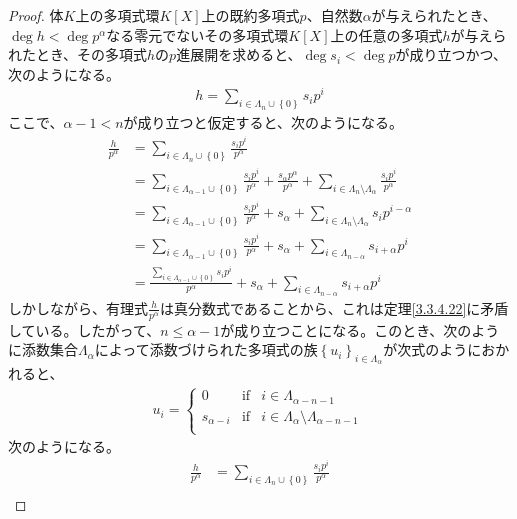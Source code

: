 \documentclass[dvipdfmx]{jsarticle}
\begin{document}
\begin{proof}
体$K$上の多項式環$K[ X]$上の既約多項式$p$、自然数$\alpha$が与えられたとき、$\deg h < \deg p^{\alpha}$なる零元でないその多項式環$K[ X]$上の任意の多項式$h$が与えられたとき、その多項式$h$の$p$進展開を求めると、$\deg s_{i} < \deg p$が成り立つかつ、次のようになる。
\begin{align*}
h = \sum_{i \in \varLambda_{n} \cup \left\{ 0 \right\}} {s_{i}p^{i}}
\end{align*}
ここで、$\alpha - 1 < n$が成り立つと仮定すると、次のようになる。
\begin{align*}
\frac{h}{p^{\alpha}} &= \sum_{i \in \varLambda_{n} \cup \left\{ 0 \right\}} \frac{s_{i}p^{i}}{p^{\alpha}}\\
&= \sum_{i \in \varLambda_{\alpha - 1} \cup \left\{ 0 \right\}} \frac{s_{i}p^{i}}{p^{\alpha}} + \frac{s_{\alpha}p^{\alpha}}{p^{\alpha}} + \sum_{i \in \varLambda_{n} \setminus \varLambda_{\alpha}} \frac{s_{i}p^{i}}{p^{\alpha}}\\
&= \sum_{i \in \varLambda_{\alpha - 1} \cup \left\{ 0 \right\}} \frac{s_{i}p^{i}}{p^{\alpha}} + s_{\alpha} + \sum_{i \in \varLambda_{n} \setminus \varLambda_{\alpha}} {s_{i}p^{i - \alpha}}\\
&= \sum_{i \in \varLambda_{\alpha - 1} \cup \left\{ 0 \right\}} \frac{s_{i}p^{i}}{p^{\alpha}} + s_{\alpha} + \sum_{i \in \varLambda_{n - \alpha}} {s_{i + \alpha}p^{i}}\\
&= \frac{\sum_{i \in \varLambda_{\alpha - 1} \cup \left\{ 0 \right\}} {s_{i}p^{i}}}{p^{\alpha}} + s_{\alpha} + \sum_{i \in \varLambda_{n - \alpha}} {s_{i + \alpha}p^{i}}
\end{align*}
しかしながら、有理式$\frac{h}{p^{\alpha}}$は真分数式であることから、これは定理\ref{3.3.4.22}に矛盾している。したがって、$n \leq \alpha - 1$が成り立つことになる。このとき、次のように添数集合$\varLambda_{\alpha}$によって添数づけられた多項式の族$\left\{ u_{i} \right\}_{i \in \varLambda_{\alpha}}$が次式のようにおかれると、
\begin{align*}
u_{i} = \left\{ \begin{matrix}
0 & \mathrm{if} & i \in \varLambda_{\alpha - n - 1} \\
s_{\alpha - i} & \mathrm{if} & i \in \varLambda_{\alpha} \setminus \varLambda_{\alpha - n - 1} \\
\end{matrix} \right.\ 
\end{align*}
次のようになる。
\begin{align*}
\frac{h}{p^{\alpha}} &= \sum_{i \in \varLambda_{n} \cup \left\{ 0 \right\}} \frac{s_{i}p^{i}}{p^{\alpha}}\\

\end{align*}
\end{proof}
\end{document}
